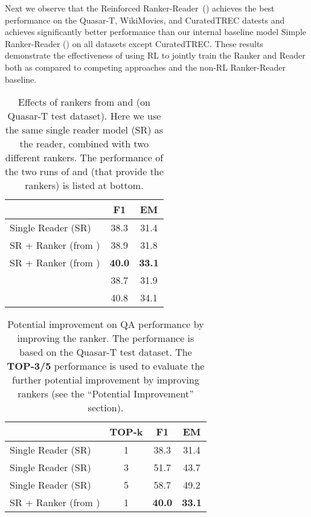 \documentclass[letterpaper]{article} \usepackage{aaai18}  \usepackage{times}  \usepackage{helvet}  \usepackage{courier}  \usepackage{url}  \usepackage{graphicx}  \usepackage{comment}
\begin{document}
Next we observe that the Reinforced Ranker-Reader~() achieves the best performance on the Quasar-T, WikiMovies, and CuratedTREC datests and achieves significantly better performance than our internal baseline model Simple Ranker-Reader () on all datasets except CuratedTREC.
These results demonstrate the effectiveness of using RL to jointly train the Ranker and Reader both as compared to competing approaches and the non-RL Ranker-Reader baseline. 


\begin{table}[t]
\centering
\begin{tabular}{lcc}
\toprule
                  & F1            & EM \\
                  \midrule
Single Reader (SR) & 38.3 & 31.4 \\
SR + Ranker (from )  & 38.9 & 31.8 \\
SR + Ranker (from )  & \textbf{40.0} & \textbf{33.1}  \\ 
\midrule
  & 38.7 & 31.9 \\
  & {40.8} & {34.1}  \\ 
\bottomrule
                  \end{tabular}
\caption{Effects of rankers from  and  (on Quasar-T test dataset). Here we use the same single reader model (SR) as the reader, combined with two different rankers.
The performance of the two runs of  and  (that provide the rankers) is listed at bottom.
}
\label{tab:analysis1}
\end{table}


\begin{table}[h]
\centering
\begin{tabular}{lccc}
\toprule
                 & TOP-k & F1            & EM \\
                  \midrule
Single Reader (SR) & 1 & 38.3 & 31.4 \\
Single Reader (SR) & 3 & 51.7 & 43.7 \\
Single Reader (SR) & 5 & 58.7 & 49.2 \\
SR + Ranker (from ) & 1  & \textbf{40.0} & \textbf{33.1} \\
\bottomrule
                  \end{tabular}
\caption{Potential improvement on QA performance by improving the ranker. The performance is based on the Quasar-T test dataset.  
The \textbf{TOP-3/5} performance is used to evaluate the further potential improvement by improving rankers (see the ``Potential Improvement'' section).
}
\label{tab:analysis_upper}

\end{table}
\end{document}
